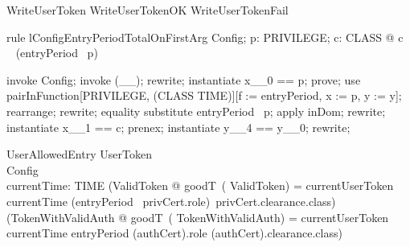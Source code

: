\begin{zed}
WriteUserToken  WriteUserTokenOK \lor  WriteUserTokenFail
\end{zed}

\begin{theorem}{rule lConfigEntryPeriodTotalOnFirstArg}
\forall  Config; p: PRIVILEGE; c: CLASS @ c \in  \dom~  (entryPeriod~ p)
\end{theorem}

\begin{zproof}[lConfigEntryPeriodTotalOnFirstArg]
invoke Config;
invoke (\_\fun \_);
rewrite;
instantiate x\_\_0 == p;
prove;
use pairInFunction[PRIVILEGE, \power  (CLASS \cross  \power  TIME)][f := entryPeriod, x := p, y := y];
rearrange;
rewrite;
equality substitute entryPeriod~ p;
apply inDom;
rewrite;
instantiate x\_\_1 == c;
prenex;
instantiate y\_\_4 == y\_\_0;
rewrite;
\end{zproof}

\begin{schema}{UserAllowedEntry}
  UserToken\\
  Config\\
  currentTime: TIME
\where
  (\exists  ValidToken @ goodT~( \theta  ValidToken) = currentUserToken \land  currentTime \in  (entryPeriod~ privCert.role)~privCert.clearance.class) \lor  (\exists  TokenWithValidAuth @ goodT~( \theta  TokenWithValidAuth) = currentUserToken \land  currentTime \in  entryPeriod (\The authCert).role (\The authCert).clearance.class)
\end{schema}

